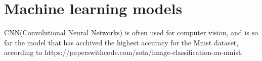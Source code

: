 \section{Machine learning models}\label{sec:machine-learning-models}





CNN(Convolutional Neural Networks) is often used for computer vision, and is so far the model that has acchived the highest accuracy for the Mnist dataset, according to https://paperswithcode.com/sota/image-classification-on-mnist.


